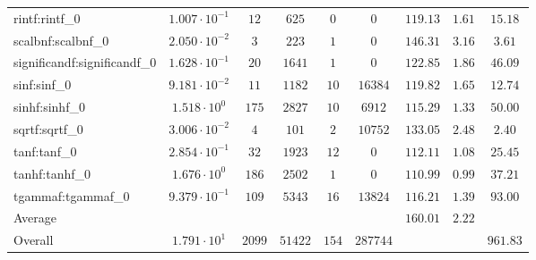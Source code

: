 \begin{tabular}{|l|c|c|c|c|c|c|c|c|}
rintf:rintf\_0               & $ 1.007 \cdot 10^{-1} $ & $ 12     $ & $ 625   $ & $ 0   $ & $ 0      $ & $ 119.13      $ & $ 1.61    $ & $ 15.18   $ \\
scalbnf:scalbnf\_0           & $ 2.050 \cdot 10^{-2} $ & $ 3      $ & $ 223   $ & $ 1   $ & $ 0      $ & $ 146.31      $ & $ 3.16    $ & $ 3.61    $ \\
significandf:significandf\_0 & $ 1.628 \cdot 10^{-1} $ & $ 20     $ & $ 1641  $ & $ 1   $ & $ 0      $ & $ 122.85      $ & $ 1.86    $ & $ 46.09   $ \\
sinf:sinf\_0                 & $ 9.181 \cdot 10^{-2} $ & $ 11     $ & $ 1182  $ & $ 10  $ & $ 16384  $ & $ 119.82      $ & $ 1.65    $ & $ 12.74   $ \\
sinhf:sinhf\_0               & $ 1.518 \cdot 10^{0}  $ & $ 175    $ & $ 2827  $ & $ 10  $ & $ 6912   $ & $ 115.29      $ & $ 1.33    $ & $ 50.00   $ \\
sqrtf:sqrtf\_0               & $ 3.006 \cdot 10^{-2} $ & $ 4      $ & $ 101   $ & $ 2   $ & $ 10752  $ & $ 133.05      $ & $ 2.48    $ & $ 2.40    $ \\
tanf:tanf\_0                 & $ 2.854 \cdot 10^{-1} $ & $ 32     $ & $ 1923  $ & $ 12  $ & $ 0      $ & $ 112.11      $ & $ 1.08    $ & $ 25.45   $ \\
tanhf:tanhf\_0               & $ 1.676 \cdot 10^{0}  $ & $ 186    $ & $ 2502  $ & $ 1   $ & $ 0      $ & $ 110.99      $ & $ 0.99    $ & $ 37.21   $ \\
tgammaf:tgammaf\_0           & $ 9.379 \cdot 10^{-1} $ & $ 109    $ & $ 5343  $ & $ 16  $ & $ 13824  $ & $ 116.21      $ & $ 1.39    $ & $ 93.00   $ \\
\hline
Average                      & $                     $ & $        $ & $       $ & $     $ & $        $ & $ 160.01      $ & $ 2.22    $ & $         $ \\
\hline
Overall                      & $ 1.791 \cdot 10^{1}  $ & $ 2099   $ & $ 51422 $ & $ 154 $ & $ 287744 $ & $             $ & $         $ & $ 961.83  $ \\
\hline
\end{tabular}
